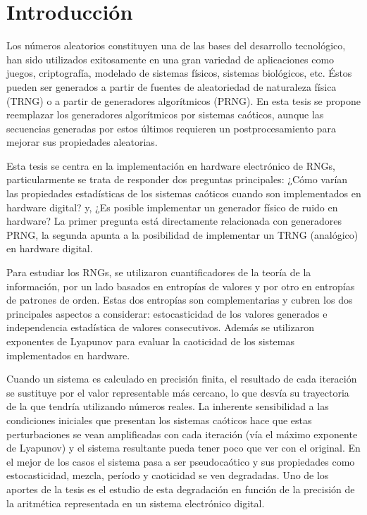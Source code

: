 \chapter{Introducción}

Los números aleatorios constituyen una de las bases del desarrollo tecnológico, han sido utilizados exitosamente en una gran variedad de aplicaciones como juegos, criptografía, modelado de sistemas físicos, sistemas biológicos, etc.
Éstos pueden ser generados a partir de fuentes de aleatoriedad de naturaleza física (TRNG) o a partir de generadores algorítmicos (PRNG).
En esta tesis se propone reemplazar los generadores algorítmicos por sistemas caóticos, aunque las secuencias generadas por estos últimos requieren un postprocesamiento para mejorar sus propiedades aleatorias.

Esta tesis se centra en la implementación en hardware electrónico de RNGs, particularmente se trata de responder dos preguntas principales: ¿Cómo varían las propiedades estadísticas de los sistemas caóticos cuando son implementados en hardware digital? y, ¿Es posible implementar un generador físico de ruido en hardware?
La primer pregunta está directamente relacionada con generadores PRNG, la segunda apunta a la posibilidad de implementar un TRNG (analógico) en hardware digital.

Para estudiar los RNGs, se utilizaron cuantificadores de la teoría de la información, por un lado basados en entropías de valores y por otro en entropías de patrones de orden.
Estas dos entropías son complementarias y cubren los dos principales aspectos a considerar: estocasticidad de los valores generados e  independencia estadística de valores consecutivos.
Además se utilizaron exponentes de Lyapunov para evaluar la caoticidad de los sistemas implementados en hardware.

Cuando un sistema es calculado en precisión finita, el resultado de cada iteración se sustituye por el valor representable más cercano, lo que desvía su trayectoria de la que tendría utilizando números reales.
La inherente sensibilidad a las condiciones iniciales que presentan los sistemas caóticos hace que estas perturbaciones se vean amplificadas con cada iteración (vía el máximo exponente de Lyapunov) y el sistema resultante pueda tener poco que ver con el original.
En el mejor de los casos el sistema pasa a ser pseudocaótico y sus propiedades como estocasticidad, mezcla, período y caoticidad se ven degradadas.
Uno de los aportes de la tesis es el estudio de esta degradación en función de la precisión de la aritmética representada en un sistema electrónico digital.


